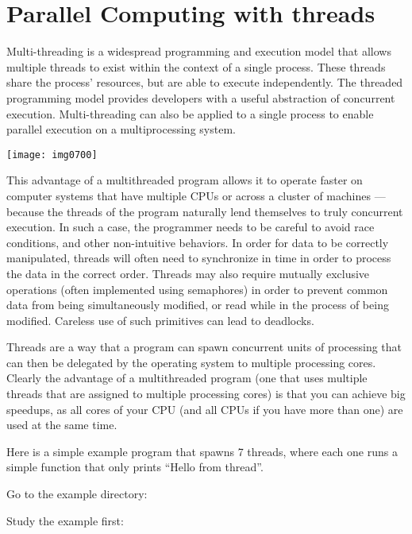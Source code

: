 \section{Parallel Computing with threads}

Multi-threading is a widespread programming and execution model that allows
multiple threads to exist within the context of a single process. These threads
share the process' resources, but are able to execute independently. The
threaded programming model provides developers with a useful abstraction of
concurrent execution. Multi-threading can also be applied to a single process
to enable parallel execution on a multiprocessing system.

\texttt{[image: img0700]}

This advantage of a multithreaded program allows it to operate faster on
computer systems that have multiple CPUs or across a cluster of machines ---
because the threads of the program naturally lend themselves to truly
concurrent execution. In such a case, the programmer needs to be careful to
avoid race conditions, and other non-intuitive behaviors. In order for data to
be correctly manipulated, threads will often need to synchronize in time in
order to process the data in the correct order. Threads may also require
mutually exclusive operations (often implemented using semaphores) in order to
prevent common data from being simultaneously modified, or read while in the
process of being modified. Careless use of such primitives can lead to
deadlocks.

Threads are a way that a program can spawn concurrent units of processing that
can then be delegated by the operating system to multiple processing cores.
Clearly the advantage of a multithreaded program (one that uses multiple
threads that are assigned to multiple processing cores) is that you can achieve
big speedups, as all cores of your CPU (and all CPUs if you have more than one)
are used at the same time.

Here is a simple example program that spawns 7 threads, where each one runs a
simple function that only prints ``Hello from thread''.

Go to the example directory:

\begin{prompt}
\end{prompt}

Study the example first:


